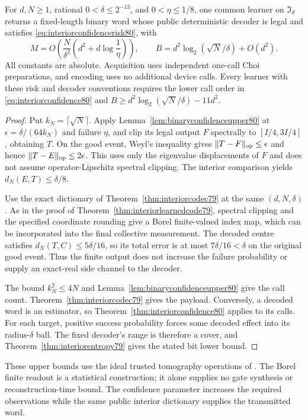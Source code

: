\begin{corollary}
\label{cor:interiorconfidencecode80}
For $d,N\ge1$, rational $0<\delta\le2^{-13}$, and
$0<\eta\le1/8$, one common learner on $\mathfrak I_d$ returns
a fixed-length binary word whose public deterministic decoder is
legal and satisfies \eqref{eq:interiorconfidencerisk80}, with
\begin{equation}\label{eq:interiorconfidencecode80}
 M=O\!\left(\frac{N}{\delta^2}
                  \left(d^2+d\log\frac1\eta\right)\right),
 \qquad
 B=d^2\log_2(\sqrt N/\delta)+O(d^2).
\end{equation}
All constants are absolute.  Acquisition uses independent one-call
Choi preparations, and encoding uses no additional device calls.
Every learner with these risk and decoder conventions requires
the lower call order in \eqref{eq:interiorconfidence80} and
$B\ge d^2\log_2(\sqrt N/\delta)-11d^2$.
\end{corollary}
\begin{proof}
Put $k_N=\lceil\sqrt N\rceil$.  Apply
Lemma~\ref{lem:binaryconfidenceupper80} at
$\epsilon=\delta/(64k_N)$ and failure $\eta$, and clip its legal
output $F$ spectrally to $[I/4,3I/4]$, obtaining $T$.
On the good event, Weyl's inequality gives
$\|T-F\|_{\rm op}\le\epsilon$ and hence
$\|T-E\|_{\rm op}\le2\epsilon$.
This uses only the eigenvalue displacements of $F$ and does not
assume operator-Lipschitz spectral clipping.  The interior
comparison yields $d_N(E,T)\le\delta/8$.

Use the exact dictionary of Theorem~\ref{thm:interiorcodec79}
at the same $(d,N,\delta)$.  As in the proof of
Theorem~\ref{thm:interiorlearnedcode79}, spectral clipping and
the specified coordinate rounding give a Borel finite-valued
index map, which can be incorporated into the final collective
measurement.  The decoded centre satisfies
$d_N(T,C)\le5\delta/16$, so its total error is at most
$7\delta/16<\delta$ on the original good event.
Thus the finite output does not increase the failure probability
or supply an exact-real side channel to the decoder.

The bound $k_N^2\le4N$ and Lemma~\ref{lem:binaryconfidenceupper80}
give the call count.  Theorem~\ref{thm:interiorcodec79} gives the
payload.  Conversely, a decoded word is an estimator, so
Theorem~\ref{thm:interiorconfidence80} applies to its calls.
For each target, positive success probability forces some decoded
effect into its radius-$\delta$ ball.  The fixed decoder's range
is therefore a cover, and Theorem~\ref{thm:interiorentropy79}
gives the stated bit lower bound.
\end{proof}

These upper bounds use the ideal trusted tomography operations of
\cite{MB67}.  The Borel finite readout is a statistical construction;
it alone supplies no gate synthesis or reconstruction-time bound.
The confidence parameter increases the required observations while
the same public interior dictionary supplies the transmitted word.
